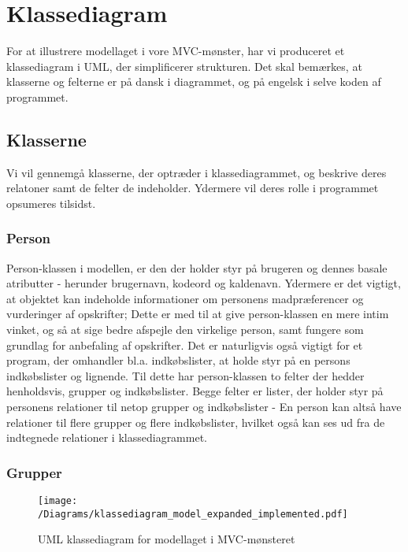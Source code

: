 \chapter{Klassediagram}
For at illustrere modellaget i vore MVC-mønster, har vi produceret et klassediagram i UML, der simplificerer strukturen. 
Det skal bemærkes, at klasserne og felterne er på dansk i diagrammet, og på engelsk i selve koden af programmet.
\section{Klasserne}
Vi vil gennemgå klasserne, der optræder i klassediagrammet, og beskrive deres relatoner samt de felter de indeholder. Ydermere vil deres rolle i programmet opsumeres tilsidst.
\subsection{Person}
Person-klassen i modellen, er den der holder styr på brugeren og dennes basale atributter - herunder brugernavn, kodeord og kaldenavn. 
Ydermere er det vigtigt, at objektet kan indeholde informationer om personens madpræferencer og vurderinger af opskrifter; Dette er med til at give person-klassen en mere intim vinket, og så at sige bedre afspejle den virkelige person, samt fungere som grundlag for anbefaling af opskrifter. 
Det er naturligvis også vigtigt for et program, der omhandler bl.a. indkøbslister, at holde styr på en persons indkøbslister og lignende. 
Til dette har person-klassen to felter der hedder henholdsvis, grupper og indkøbslister. 
Begge felter er lister, der holder styr på personens relationer til netop grupper og indkøbslister - En person kan altså have relationer til flere grupper og flere indkøbslister, hvilket også kan ses ud fra de indtegnede relationer i klassediagrammet.
\subsection{Grupper} 
\begin{figure}[h]
\texttt{[image: /Diagrams/klassediagram\_model\_expanded\_implemented.pdf]}
\caption{UML klassediagram for modellaget i MVC-mønsteret}
\end{figure}
